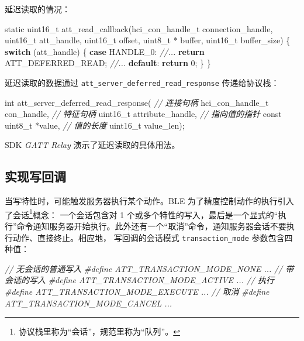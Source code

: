 \documentclass[
  12pt,
]{book}
\newenvironment{Shaded}{\begin{snugshade}}{\end{snugshade}}
\newcommand{\CommentTok}[1]{\textcolor[rgb]{0.56,0.35,0.01}{\textit{#1}}}
\newcommand{\ControlFlowTok}[1]{\textcolor[rgb]{0.13,0.29,0.53}{\textbf{#1}}}
\newcommand{\DataTypeTok}[1]{\textcolor[rgb]{0.13,0.29,0.53}{#1}}
\newcommand{\DecValTok}[1]{\textcolor[rgb]{0.00,0.00,0.81}{#1}}
\newcommand{\NormalTok}[1]{#1}
\newcommand{\PreprocessorTok}[1]{\textcolor[rgb]{0.56,0.35,0.01}{\textit{#1}}}
\begin{document}
延迟读取的情况：

\begin{Shaded}
\begin{Highlighting}[]
\DataTypeTok{static} \DataTypeTok{uint16_t}\NormalTok{ att_read_callback(hci_con_handle_t connection_handle,}
  \DataTypeTok{uint16_t}\NormalTok{ att_handle, }\DataTypeTok{uint16_t}\NormalTok{ offset,}
  \DataTypeTok{uint8_t}\NormalTok{ * buffer, }\DataTypeTok{uint16_t}\NormalTok{ buffer_size)}
\NormalTok{\{}
    \ControlFlowTok{switch}\NormalTok{ (att_handle)}
\NormalTok{    \{}
    \ControlFlowTok{case}\NormalTok{ HANDLE_0:}
        \CommentTok{//...}
        \ControlFlowTok{return}\NormalTok{ ATT_DEFERRED_READ;}
    \CommentTok{//...}
    \ControlFlowTok{default}\NormalTok{:}
        \ControlFlowTok{return} \DecValTok{0}\NormalTok{;}
\NormalTok{    \}}
\NormalTok{\}}
\end{Highlighting}
\end{Shaded}

延迟读取的数据通过 \texttt{att\_server\_deferred\_read\_response} 传递给协议栈：

\begin{Shaded}
\begin{Highlighting}[]
\DataTypeTok{int}\NormalTok{ att_server_deferred_read_response(}
  \CommentTok{// 连接句柄}
\NormalTok{  hci_con_handle_t con_handle,}
  \CommentTok{// 特征句柄}
  \DataTypeTok{uint16_t}\NormalTok{ attribute_handle,}
  \CommentTok{// 指向值的指针}
  \DataTypeTok{const} \DataTypeTok{uint8_t}\NormalTok{ *value,}
  \CommentTok{// 值的长度}
  \DataTypeTok{uint16_t}\NormalTok{ value_len);}
\end{Highlighting}
\end{Shaded}

SDK \emph{GATT Relay} 演示了延迟读取的具体用法。

\hypertarget{ux5b9eux73b0ux5199ux56deux8c03}{%
\subsection{实现写回调}\label{ux5b9eux73b0ux5199ux56deux8c03}}

当写特性时，可能触发服务器执行某个动作。BLE 为了精度控制动作的执行引入了会话\footnote{协议栈里称为``会话''，规范里称为``队列''。}概念：
一个会话包含对 1 个或多个特性的写入，最后是一个显式的``执行''命令通知服务器开始执行。此外还有一个``取消''命令，通知服务器会话不要执行动作、直接终止。相应地，
写回调的会话模式 \texttt{transaction\_mode} 参数包含四种值：

\begin{Shaded}
\begin{Highlighting}[]
\CommentTok{// 无会话的普通写入}
\PreprocessorTok{#define ATT_TRANSACTION_MODE_NONE      ...}
\CommentTok{// 带会话的写入}
\PreprocessorTok{#define ATT_TRANSACTION_MODE_ACTIVE    ...}
\CommentTok{// 执行}
\PreprocessorTok{#define ATT_TRANSACTION_MODE_EXECUTE   ...}
\CommentTok{// 取消}
\PreprocessorTok{#define ATT_TRANSACTION_MODE_CANCEL    ...}
\end{Highlighting}
\end{Shaded}
\end{document}
